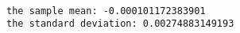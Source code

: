 \documentclass[a4paper,dvipdfmx]{jsarticle}
\newlength{\cellleftmargin}
\newlength{\smallerfontscale}
\def\smaller{\fontsize{\smallerfontscale}{\smallerfontscale}\selectfont}
\begin{document}
    \begin{addmargin}[\cellleftmargin]{0em}%
    {\smaller%
    \vspace{-1\smallerfontscale}%
    
    \begin{center}
    \end{center}
    { \hspace*{\fill} \\}
    }%
    \end{addmargin}%
    \begin{addmargin}[\cellleftmargin]{0em}%
    {\smaller%
    \vspace{-1\smallerfontscale}%
    
    \begin{Verbatim}[commandchars=\\\{\}]
the sample mean: -0.000101172383901
the standard deviation: 0.00274883149193

    \end{Verbatim}
}%
    \end{addmargin}%
    \begin{addmargin}[\cellleftmargin]{0em}%
    {\smaller%
    \vspace{-1\smallerfontscale}%
    
    \begin{center}
    \end{center}
    { \hspace*{\fill} \\}
    }%
    \end{addmargin}%
\end{document}
